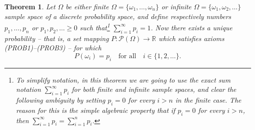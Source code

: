\documentclass[12pt,a4paper,leqno]{report}
\newcommand{\R}{\mathbb{R}}
\theoremstyle{plain}
\newtheorem{lause}[equation]{Theorem}
\theoremstyle{definition}
\begin{document}
\begin{lause}
\label{lause:discrete_prob}
Let $\Omega$ be either finite $\Omega =\{\omega_1, \dots, \omega_n\}$ or infinite $\Omega = \{\omega_1, \omega_2, \dots\}$ sample space of a discrete probability space, and define respectively numbers $p_1, \dots , p_n$ or $p_1, p_2, \ldots \geq 0$ such that\footnote{To simplify notation, in this theorem we are going to use the exact sum notation $\sum_{i=1}^\infty p_i$ for both finite and infinite sample spaces, and clear the following ambiguity by setting $p_i=0$ for every $i>n$ in the finite case. The reason for this is the simple algebraic property that if $p_i=0$ for every $i>n$, then $\sum_{i=1}^\infty p_i = \sum_{i=1}^n p_i$.} $\sum_{i=1}^\infty p_i = 1$. Now there exists a unique probability -- that is, a set mapping $P:\mathcal{P}(\Omega)\rightarrow \R$ which satisfies axioms (PROB1)--(PROB3) -- for which 
\begin{equation}
\label{eq:discrete_prob}
P(\omega_i) = p_i \quad \text{for all} \quad i \in \{1,2, \dots \}.
\end{equation}

\end{lause}
\end{document}
